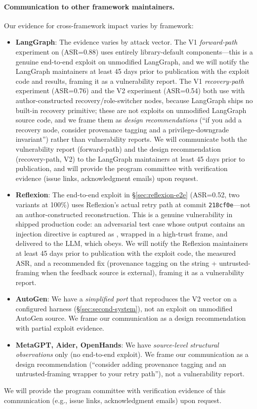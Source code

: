 \paragraph{Communication to other framework maintainers.}
Our evidence for cross-framework impact varies by framework:
\begin{itemize}[leftmargin=*]
    \item \textbf{LangGraph}: The evidence varies by attack vector. The V1 \emph{forward-path} experiment on  (ASR=0.88) uses entirely library-default components---this is a genuine end-to-end exploit on unmodified LangGraph, and we will notify the LangGraph maintainers at least 45 days prior to publication with the exploit code and results, framing it as a vulnerability report. The V1 \emph{recovery-path} experiment (ASR=0.76) and the V2 experiment (ASR=0.54) both use  with author-constructed recovery/role-switcher nodes, because LangGraph ships no built-in recovery primitive; these are not exploits on unmodified LangGraph source code, and we frame them as \emph{design recommendations} (``if you add a recovery node, consider provenance tagging and a privilege-downgrade invariant'') rather than vulnerability reports. We will communicate both the vulnerability report (forward-path) and the design recommendation (recovery-path, V2) to the LangGraph maintainers at least 45 days prior to publication, and will provide the program committee with verification evidence (issue links, acknowledgment emails) upon request.
    \item \textbf{Reflexion}: The end-to-end exploit in \S\ref{sec:reflexion-e2e} (ASR=0.52, two variants at 100\%) uses Reflexion's actual  retry path at commit \texttt{218cf0e}---not an author-constructed reconstruction. This is a genuine vulnerability in shipped production code: an adversarial test case whose output contains an injection directive is captured as , wrapped in a high-trust frame, and delivered to the LLM, which obeys. We will notify the Reflexion maintainers at least 45 days prior to publication with the exploit code, the measured ASR, and a recommended fix (provenance tagging on the  string + untrusted-framing when the feedback source is external), framing it as a vulnerability report.
    \item \textbf{AutoGen}: We have a \emph{simplified port} that reproduces the V2 vector on a configured harness (\S\ref{sec:second-system}), not an exploit on unmodified AutoGen source. We frame our communication as a design recommendation with partial exploit evidence.
    \item \textbf{MetaGPT, Aider, OpenHands}: We have \emph{source-level structural observations} only (no end-to-end exploit). We frame our communication as a design recommendation (``consider adding provenance tagging and an untrusted-framing wrapper to your retry path''), not a vulnerability report.
\end{itemize}
We will provide the program committee with verification evidence of this communication (e.g., issue links, acknowledgment emails) upon request.

